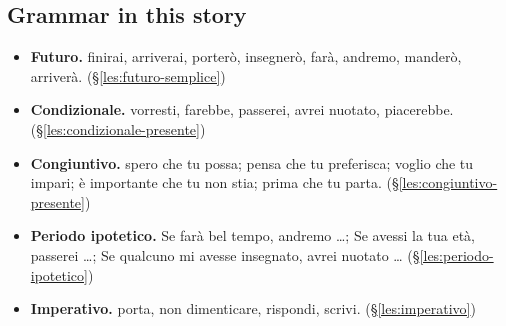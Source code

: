 \documentclass[11pt,a4paper,twoside,openright]{book}
\begin{document}
\subsection*{Grammar in this story}
\begin{itemize}
\item\relax \textbf{Futuro.} finirai, arriverai, porterò, insegnerò, farà, andremo, manderò, arriverà. (\S\ref{les:futuro-semplice})
\item\relax \textbf{Condizionale.} vorresti, farebbe, passerei, avrei nuotato, piacerebbe. (\S\ref{les:condizionale-presente})
\item\relax \textbf{Congiuntivo.} spero che tu possa; pensa che tu preferisca; voglio che tu impari; è importante che tu non stia; prima che tu parta. (\S\ref{les:congiuntivo-presente})
\item\relax \textbf{Periodo ipotetico.} Se farà bel tempo, andremo …; Se avessi la tua età, passerei …; Se qualcuno mi avesse insegnato, avrei nuotato … (\S\ref{les:periodo-ipotetico})
\item\relax \textbf{Imperativo.} porta, non dimenticare, rispondi, scrivi. (\S\ref{les:imperativo})
\end{itemize}
\end{document}
